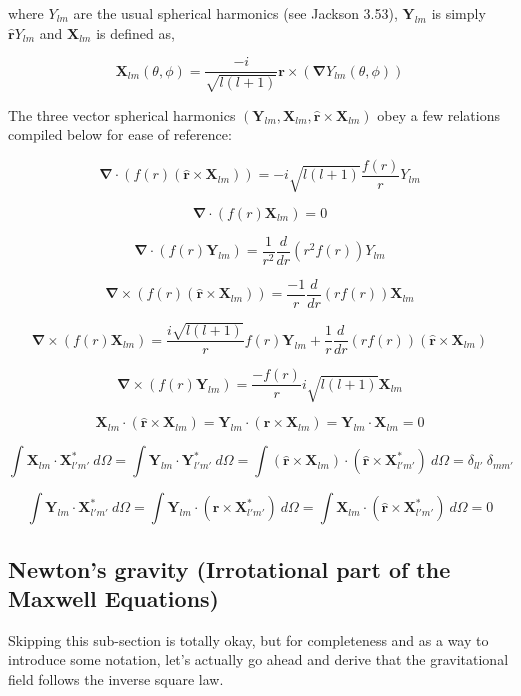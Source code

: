 \documentclass {article}
\renewcommand\vec{\mathbf}
\let\OldS\nabla
\renewcommand{\nabla}{\boldsymbol{\OldS}}
\let\OldHat\hat
\renewcommand{\hat}[1]{\OldHat{\mathbf{#1}}}
\begin{document}
where $Y_{lm}$ are the usual spherical harmonics (see Jackson 3.53), $\vec Y_{lm}$ is simply $\hat r Y_{lm}$  and $\vec X_{lm}$ is defined as,

$$\vec X_{lm}(\theta, \phi) = \frac {-i}{\sqrt{l(l+1)}} \vec r \times \left( \nabla Y_{lm}(\theta, \phi) \right) $$

The three vector spherical harmonics $(\vec Y_{lm}, \vec X_{lm}, \hat r \times \vec X_{lm} )$ obey a few relations compiled below for ease of reference:

$$\nabla  \cdot \left( f(r) \left( \hat r \times \vec X_{lm} \right) \right) = - i \sqrt {l(l+1)} \frac {f(r)} {r} Y_{lm}$$

$$\nabla \cdot \left( f(r) \vec X_{lm} \right) = 0 $$

$$ \nabla \cdot \left( f(r) \vec Y_{lm} \right) = \frac {1}{r^2} \frac d {dr} \left(r^2 f(r) \right) Y_{lm}$$

$$\nabla \times \left( f(r) \left( \hat r \times \vec X_{lm} \right) \right) = \frac {-1} {r} \frac d {dr} \left( r f(r) \right) \vec X_{lm}$$

$$\nabla \times \left( f(r) \vec X_{lm} \right) = \frac {i \sqrt{l(l+1)} } {r} f(r) \vec Y_{lm} + \frac 1 r \frac d {dr} \left( r f(r) \right) \left( \hat r \times \vec X_{lm} \right)$$

$$\nabla \times \left( f(r) \vec Y_{lm} \right) = \frac {- f(r)} r i \sqrt {l (l+1)} \vec X_{lm}$$

$$ \vec X_{lm} \cdot ( \hat r \times \vec X_{lm}) = \vec Y_{lm} \cdot  ( \hat r \times \vec X_{lm}) = \vec Y_{lm} \cdot \vec X_{lm} = 0$$ 

$$ \int \vec X_{lm} \cdot \vec X_{l' m'}^* ~ d \Omega  = \int \vec Y_{lm} \cdot \vec Y_{l' m'}^* ~ d \Omega  = \int ( \hat r \times \vec X_{lm}) \cdot ( \hat r \times \vec X_{l' m'}^*) ~ d \Omega  = \delta_{ll'} ~ \delta_{m m'} $$

$$\int \vec Y_{lm} \cdot \vec X_{l' m'}^* ~ d \Omega = \int \vec Y_{lm} \cdot ( \hat r \times \vec X_{l' m'}^* ) ~ d \Omega  =  \int \vec X_{lm} \cdot ( \hat r \times \vec X_{l' m'}^* ) ~ d \Omega   = 0 $$

\newpage
\subsection{Newton's gravity (Irrotational part of the Maxwell Equations)}

Skipping this sub-section is totally okay, but for completeness and as a way to introduce some notation, let's actually go ahead and derive that the gravitational field follows the inverse square law. 
\end{document}
